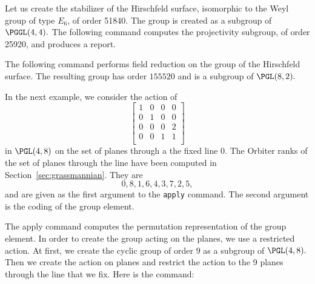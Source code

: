 




\bigskip



Let us create the stabilizer of the Hirschfeld surface, 
isomorphic to the Weyl group of type $E_6$,
of order 51840. 
The group is created as a subgroup of $\PGGL(4,4).$ 
The following command computes the projectivity subgroup, 
of order 25920, and produces a report.




\bigskip


The following command performs field reduction on the group of the Hirschfeld surface. 
The resulting group has order $155520$ and is a subgroup of $\PGL(8,2).$





\bigskip


In the next example, we consider the action of 
$$
\left[
\begin{array}{cccc}
1&0&0&0 \\
0&1&0&0 \\
0&0&0&2 \\
0&0&1&1 \\
\end{array}
\right]
$$
in $\PGL(4,8)$
on the set of planes through a the fixed line 0. 
The Orbiter ranks of the set of planes through the line 
have been computed in Section~\ref{sec:grassmannian}. They are 
$$
0,8,1,6,4,3,7,2,5,
$$
and are given as the first argument to the \verb'apply' command. 
The second argument is the coding of the group element.


The apply command computes the permutation representation of the group element. 
In order to create the group acting on the planes, we use a restricted action. 
At first, we create the cyclic group of order $9$ 
as a subgroup of $\PGL(4,8).$
Then we create the action on planes and restrict the action to the 9 planes 
through the line that we fix. 
Here is the command:






\bigskip





